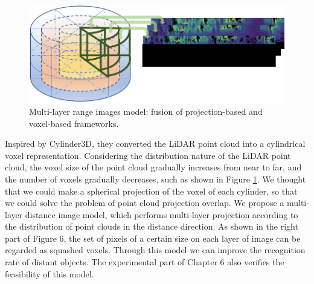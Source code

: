 \documentclass[final]{cvpr}
\begin{document}
\begin{figure}[pt]
\begin{center}
   \includegraphics[width=1\linewidth]{latex/pro-vox.png}
\end{center}
   \caption{Multi-layer range images model: fusion of projection-based and voxel-based frameworks.}
\label{fig:provox}
\end{figure}
Inspired by Cylinder3D\cite{cylinder}, they converted the LiDAR point cloud into a cylindrical voxel representation. Considering the distribution nature of the LiDAR point cloud, the voxel size of the point cloud gradually increases from near to far, and the number of voxels gradually decreases, such as shown in Figure \ref{fig:provox}.  We thought that we could make a spherical projection of the voxel of each cylinder, so that we could solve the problem of point cloud projection overlap.  We propose a multi-layer distance image model, which performs multi-layer projection according to the distribution of point clouds in the distance direction.  As shown in the right part of Figure 6, the set of pixels of a certain size on each layer of image can be regarded as squashed voxels.  Through this model we can improve the recognition rate of distant objects.  The experimental part of Chapter 6 also verifies the feasibility of this model.
\end{document}
